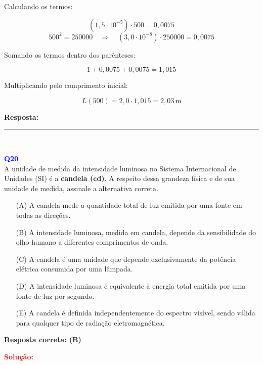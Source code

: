 \documentclass[a4paper,12pt]{article}
\begin{document}
\begin{flushleft}
Calculando os termos:

\[
(1{,}5 \cdot 10^{-5}) \cdot 500 = 0{,}0075
\]
\[
500^2 = 250000 \quad \Rightarrow \quad (3{,}0 \cdot 10^{-8}) \cdot 250000 = 0{,}0075
\]

Somando os termos dentro dos parênteses:

\[
1 + 0{,}0075 + 0{,}0075 = 1{,}015
\]

Multiplicando pelo comprimento inicial:

\[
L(500) = 2{,}0 \cdot 1{,}015 = 2{,}03\,\text{m}
\]

\textbf{Resposta:}  \quad {}

\end{flushleft}

\noindent\rule{\linewidth}{0.6pt}\\

\begin{flushleft}
\textbf{\textcolor{blue}{\Large Q20}}\\

A unidade de medida da intensidade luminosa no Sistema Internacional de Unidades (SI) é a \textbf{candela (cd)}. A respeito 
dessa grandeza física e de sua unidade de medida, assinale a alternativa correta.

\begin{enumerate}
    \item[(A)] A candela mede a quantidade total de luz emitida por uma fonte em todas as direções.
    
    \item[\colorbox{green!50}{(B)}] A intensidade luminosa, medida em candela, depende da sensibilidade do olho humano a diferentes comprimentos de onda.
    
    \item[(C)] A candela é uma unidade que depende exclusivamente da potência elétrica consumida por uma lâmpada.
    
    \item[(D)] A intensidade luminosa é equivalente à energia total emitida por uma fonte de luz por segundo.
    
    \item[(E)] A candela é definida independentemente do espectro visível, sendo válida para qualquer tipo de radiação eletromagnética.
\end{enumerate}

\textbf{Resposta correta: (B)}

\vspace{0.5cm}

\textcolor{red}{\textbf{Solução:}}\\

\end{flushleft}
\end{document}
